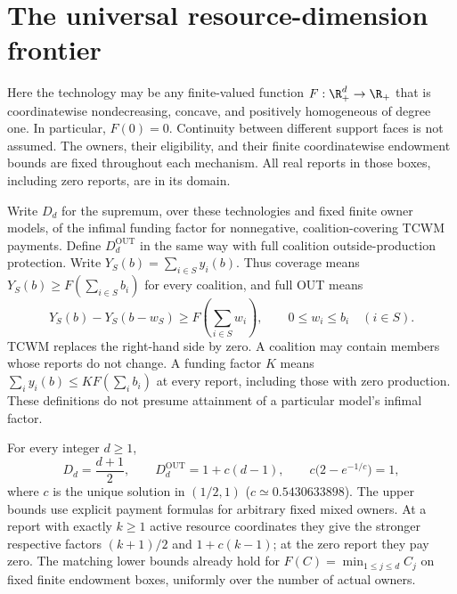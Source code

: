 \section{The universal resource-dimension frontier}
\label{dim:section}

Here the technology may be any finite-valued function
$F:\R_+^d\to\R_+$ that is coordinatewise nondecreasing, concave, and
positively homogeneous of degree one. In particular, $F(0)=0$.
Continuity between different support faces is not assumed.
The owners, their eligibility, and their finite coordinatewise endowment
bounds are fixed throughout each mechanism. All real reports in those
boxes, including zero reports, are in its domain.

Write $D_d$ for the supremum, over these technologies and fixed finite
owner models, of the infimal funding factor for nonnegative,
coalition-covering TCWM payments. Define $D_d^{\mathrm{OUT}}$ in the same
way with full coalition outside-production protection. Write $Y_S(b)=\sum_{i\in S}y_i(b)$. Thus coverage means
$Y_S(b)\ge F(\sum_{i\in S}b_i)$ for every coalition, and full OUT means
\begin{equation}\label{dim:out-contract}
 Y_S(b)-Y_S(b-w_S)\ge
 F\left(\sum_{i\in S}w_i\right),
 \qquad 0\le w_i\le b_i\quad(i\in S).
\end{equation}
TCWM replaces the right-hand side by zero. A coalition may contain members
whose reports do not change. A funding factor $K$ means
$\sum_i y_i(b)\le K F(\sum_i b_i)$ at every report, including those with
zero production. These definitions do not presume attainment of a
particular model's infimal factor.

\begin{theorem}\label{dim:main}
For every integer $d\ge1$,
\begin{equation}\label{dim:frontiers}
 D_d=\frac{d+1}{2},\qquad
 D_d^{\mathrm{OUT}}=1+c(d-1),
 \qquad c\bigl(2-e^{-1/c}\bigr)=1,
\end{equation}
where $c$ is the unique solution in $(1/2,1)$
($c\simeq0.5430633898$).
The upper bounds use explicit payment formulas for arbitrary fixed mixed
owners. At a report with exactly $k\ge1$ active resource coordinates they
give the stronger respective factors $(k+1)/2$ and $1+c(k-1)$; at the zero
report they pay zero. The matching lower bounds already hold for
$F(C)=\min_{1\le j\le d}C_j$ on fixed finite endowment boxes, uniformly
over the number of actual owners.
\end{theorem}


